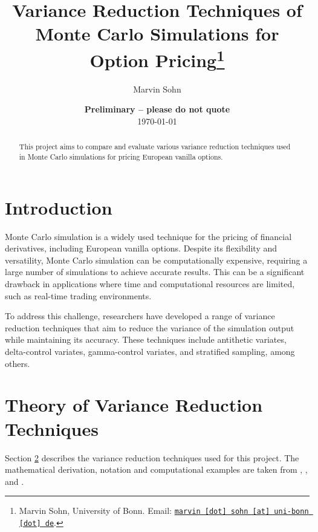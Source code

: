 \documentclass[11pt, a4paper, leqno]{article}
\begin{document}
\title{Variance Reduction Techniques of Monte Carlo Simulations for Option Pricing\thanks{Marvin Sohn, University of Bonn. Email: \href{mailto:marvin.sohn@uni-bonn.de}{\nolinkurl{marvin [dot] sohn [at] uni-bonn [dot] de}}.}}

\author{Marvin Sohn}

\date{
    {\bf Preliminary -- please do not quote}
    \\[1ex]
    \today
}

\maketitle


\begin{abstract}
    This project aims to compare and evaluate various variance reduction techniques used in Monte Carlo simulations for pricing European vanilla options.
\end{abstract}

\clearpage


\section{Introduction} %
\label{sec:introduction}

Monte Carlo simulation is a widely used technique for the pricing of financial derivatives, including European vanilla options. Despite its flexibility and versatility, Monte Carlo simulation can be computationally expensive, requiring a large number of simulations to achieve accurate results. This can be a significant drawback in applications where time and computational resources are limited, such as real-time trading environments.

To address this challenge, researchers have developed a range of variance reduction techniques that aim to reduce the variance of the simulation output while maintaining its accuracy. These techniques include antithetic variates, delta-control variates, gamma-control variates, and stratified sampling, among others.


\section{Theory of Variance Reduction Techniques}\label{sec:var_reduc_techniques}

Section \ref{sec:var_reduc_techniques} describes the variance reduction techniques used for this project. The mathematical derivation, notation and computational examples are taken from \cite{Glassermann:2004}, \cite{Hilpisch:2015}, and \cite{Clewlow:1998}.
\end{document}
